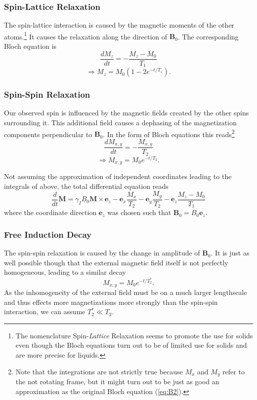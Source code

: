 \documentclass[a4paper]{scrartcl}
\numberwithin{equation}{section}
\numberwithin{figure}{section}
\numberwithin{table}{section}
\newcommand{\eq}[2]{\begin{equation}#1\label{#2}\end{equation}}
\newcommand{\ve}[1]{\mathbf{ #1} }
\begin{document}
\subsubsection*{Spin-Lattice Relaxation}
The spin-lattice interaction is caused by the magnetic moments of the other atoms.\footnote{The nomenclature Spin-\emph{Lattice} Relaxation seems to promote the use for solids even though the Bloch equations turn out to be of limited use for solids and are more precise for liquids.} It causes the relaxation along the direction of $\ve B_0$. The corresponding Bloch equation is
\eq{\frac{dM_z}{dt} = -\frac{M_z - M_0}{T_1}}{eq:B1}
\eq{\Rightarrow  M_z = M_0 \left(1 - 2e^{-t/T_1}\right) .}{}

\subsubsection*{Spin-Spin Relaxation}
Our observed spin is influenced by the magnetic fields created by the other spins surrounding it. This additional field causes a dephasing of the magnetization components perpendicular to $\ve B_0$. In the form of Bloch equations this reads\footnote{Note that the integrations are not strictly true because $M_x$ and $M_y$ refer to the not rotating frame, but it might turn out to be just as good an approximation as the original Bloch equation (\ref{eq:B2}).}
\eq{\frac{dM_{x,y}}{dt} = -\frac{M_{x,y}}{T_2}}{eq:B2}
\eq{\Rightarrow  M_{x,y}=M_0 e^{-t/T_2} .}{}

Not assuming the approximation of independent coordinates leading to the integrals of above, the total differential equation reads
\eq{\frac{d}{dt}\ve M = \gamma_I B_0 \ve M \times \ve e_z - \ve e_x \frac{M_x}{T_2} - \ve e_y \frac{M_y}{T_2} - \ve e_z \frac{M_z - M_0}{T_1} }{eq:Mtotal}
where the coordinate direction $\ve e_z$ was chosen such that $\ve B_0 = B_0 \ve e_z$.

\subsubsection*{Free Induction Decay}
The spin-spin relaxation is caused by the change in amplitude of $\ve B_0$. It is just as well possible though that the external magnetic field itself is not perfectly homogeneous, leading to a similar decay
\eq{M_{x,y} = M_0 e^{-t/T_2^*} .}{}
As the inhomogeneity of the external field must be on a much larger lengthscale and thus effects more magnetizations more strongly than the spin-spin interaction, we can assume $T_2^* \ll T_2$.
\end{document}

